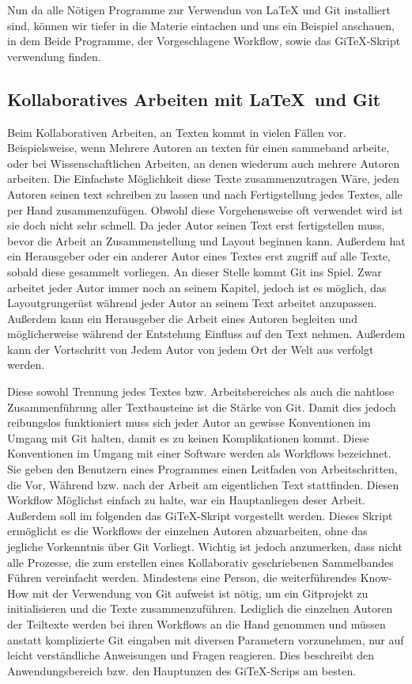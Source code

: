 \documentclass[12pt,a4paper]{scrartcl}
\begin{document}
Nun da alle Nötigen Programme zur Verwendun von LaTeX und Git installiert sind, können wir tiefer in die Materie eintachen und uns ein Beispiel anschauen, in dem Beide Programme, der Vorgeschlagene Workflow, sowie das GiTeX-Skript verwendung finden.

\subsection{Kollaboratives Arbeiten mit \LaTeX \ und Git}
Beim Kollaborativen Arbeiten, an Texten kommt in vielen Fällen vor. Beispielsweise, wenn Mehrere Autoren an texten für einen sammeband arbeite, oder bei Wissenschaftlichen Arbeiten, an denen wiederum auch mehrere Autoren arbeiten. Die Einfachste Möglichkeit diese Texte zusammenzutragen Wäre, jeden Autoren seinen text schreiben zu lassen und nach Fertigstellung jedes Textes, alle per Hand zusammenzufügen. Obwohl diese Vorgehensweise oft verwendet wird ist sie doch nicht sehr schnell. Da jeder Autor seinen Text erst fertigstellen muss, bevor die Arbeit an Zusammenstellung und Layout beginnen kann. Außerdem hat ein Herausgeber oder ein anderer Autor eines Textes erst zugriff auf alle Texte, sobald diese gesammelt vorliegen. An dieser Stelle kommt Git ins Spiel. Zwar arbeitet jeder Autor immer noch an seinem Kapitel, jedoch ist es möglich, das Layoutgrungerüst während jeder Autor an seinem Text arbeitet anzupassen. Außerdem kann ein Herausgeber die Arbeit eines Autoren begleiten und möglicherweise während der Entstehung Einfluss auf den Text nehmen. Außerdem kann der Vortschritt von Jedem Autor von jedem Ort der Welt aus verfolgt werden.

Diese sowohl Trennung jedes Textes bzw. Arbeitsbereiches als auch die nahtlose Zusammenführung aller Textbausteine ist die Stärke von Git. Damit dies jedoch reibungslos funktioniert muss sich jeder Autor an gewisse Konventionen im Umgang mit Git halten, damit es zu keinen Komplikationen kommt. Diese Konventionen im Umgang mit einer Software werden als Workflows bezeichnet. Sie geben den Benutzern eines Programmes einen Leitfaden von Arbeitschritten, die Vor, Während bzw. nach der Arbeit am eigentlichen Text stattfinden. Diesen Workflow Möglichst einfach zu halte, war ein Hauptanliegen deser Arbeit. Außerdem soll im folgenden das GiTeX-Skript vorgestellt werden. Dieses Skript ermöglicht es die Workflows der einzelnen Autoren abzuarbeiten, ohne das jegliche Vorkenntnis über Git Vorliegt. Wichtig ist jedoch anzumerken, dass nicht alle Prozesse, die zum erstellen eines Kollaborativ geschriebenen Sammelbandes Führen vereinfacht werden. Mindestens eine Person, die weiterführendes Know-How mit der Verwendung von Git aufweist ist nötig, um ein Gitprojekt zu initialisieren und die Texte zusammenzuführen. Lediglich die einzelnen Autoren der Teiltexte werden bei ihren Workflows an die Hand genommen und müssen anstatt komplizierte Git eingaben mit diversen Parametern vorzunehmen, nur auf leicht verständliche Anweisungen und Fragen reagieren. Dies beschreibt den Anwendungsbereich bzw. den Hauptunzen des GiTeX-Scrips am besten.
\end{document}
